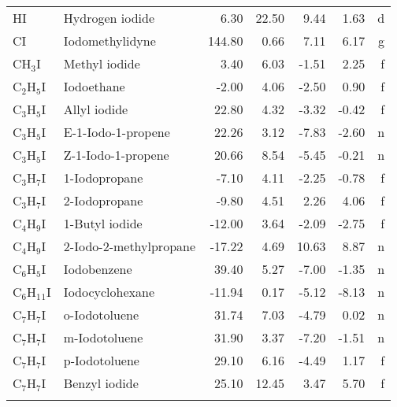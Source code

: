 \begin{table}
\begin{center}
\begin{tabular}{llrrrrr}
 HI          & Hydrogen iodide                 &     6.30    &    22.50  &     9.44  &     1.63  &      d\\
 CI          & Iodomethylidyne                 &   144.80    &     0.66  &     7.11  &     6.17  &      g\\
 CH$_3$I        & Methyl iodide                   &     3.40    &     6.03  &    -1.51  &     2.25  &      f\\
 C$_2$H$_5$I       & Iodoethane                      &    -2.00    &     4.06  &    -2.50  &     0.90  &      f\\
 C$_3$H$_5$I       & Allyl iodide                    &    22.80    &     4.32  &    -3.32  &    -0.42  &      f\\
 C$_3$H$_5$I       & E-1-Iodo-1-propene              &    22.26    &     3.12  &    -7.83  &    -2.60  &      n\\
 C$_3$H$_5$I       & Z-1-Iodo-1-propene              &    20.66    &     8.54  &    -5.45  &    -0.21  &      n\\
 C$_3$H$_7$I       & 1-Iodopropane                   &    -7.10    &     4.11  &    -2.25  &    -0.78  &      f\\
 C$_3$H$_7$I       & 2-Iodopropane                   &    -9.80    &     4.51  &     2.26  &     4.06  &      f\\
 C$_4$H$_9$I       & 1-Butyl iodide                  &   -12.00    &     3.64  &    -2.09  &    -2.75  &      f\\
 C$_4$H$_9$I       & 2-Iodo-2-methylpropane          &   -17.22    &     4.69  &    10.63  &     8.87  &      n\\
 C$_6$H$_5$I       & Iodobenzene                     &    39.40    &     5.27  &    -7.00  &    -1.35  &      n\\
 C$_6$H$_1$$_1$I      & Iodocyclohexane                 &   -11.94    &     0.17  &    -5.12  &    -8.13  &      n\\
 C$_7$H$_7$I       & o-Iodotoluene                   &    31.74    &     7.03  &    -4.79  &     0.02  &      n\\
 C$_7$H$_7$I       & m-Iodotoluene                   &    31.90    &     3.37  &    -7.20  &    -1.51  &      n\\
 C$_7$H$_7$I       & p-Iodotoluene                   &    29.10    &     6.16  &    -4.49  &     1.17  &      f\\
 C$_7$H$_7$I       & Benzyl iodide                   &    25.10    &    12.45  &     3.47  &     5.70  &      f\\
$$
\end{tabular}
\end{center}
\end{table}
